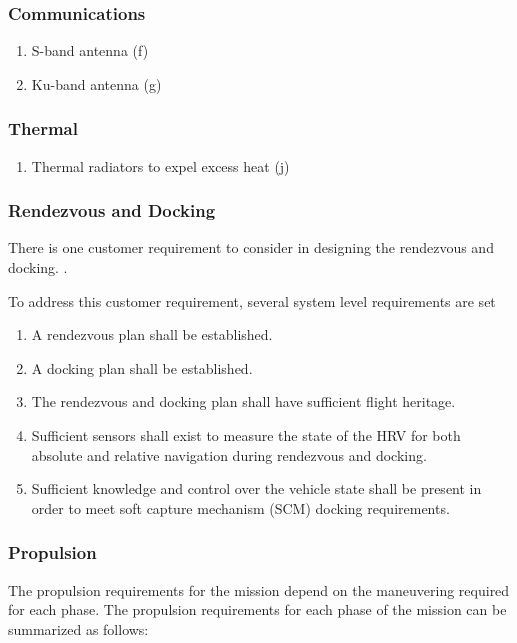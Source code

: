\documentclass[onecolumn,10pt]{jhwhw}
\begin{document}
\subsubsection{Communications}
\begin{enumerate}
\item S-band antenna (f)
\item Ku-band antenna (g)
\end{enumerate}
\subsubsection{Thermal}
\begin{enumerate}
\item Thermal radiators to expel excess heat (j)
\end{enumerate}

\subsubsection{Rendezvous and Docking}
There is one customer requirement to consider in designing the rendezvous and docking. .

To address this customer requirement, several system level requirements are set
\begin{enumerate}
\item A rendezvous plan shall be established.
\item A docking plan shall be established.
\item The rendezvous and docking plan shall have sufficient flight heritage.
\item Sufficient sensors shall exist to measure the state of the HRV for both absolute and relative navigation during rendezvous and docking.
\item Sufficient knowledge and control over the vehicle state shall be present in order to meet soft capture mechanism (SCM) docking requirements.
\end{enumerate}

\subsubsection{Propulsion}
The propulsion requirements for the mission depend on the maneuvering required for each phase. The propulsion requirements for each phase of the mission can be summarized as follows:
\end{document}
